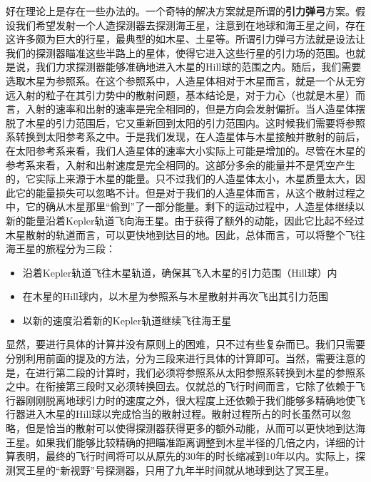 \documentclass[a4paper,openany]{book}
\begin{document}
好在理论上是存在一些办法的。一个奇特的解决方案就是所谓的\textbf{引力弹弓}方案。假设我们希望发射一个人造探测器去探测海王星，注意到在地球和海王星之间，存在这许多颇为巨大的行星，最典型的如木星、土星等。所谓引力弹弓方法就是设法让我们的探测器瞄准这些半路上的星体，使得它进入这些行星的引力场的范围。也就是说，我们力求探测器能够准确地进入木星的Hill球的范围之内。随后，我们需要选取木星为参照系。在这个参照系中，人造星体相对于木星而言，就是一个从无穷远入射的粒子在其引力势中的散射问题，基本结论是，对于力心（也就是木星）而言，入射的速率和出射的速率是完全相同的，但是方向会发射偏折。当人造星体摆脱了木星的引力范围后，它又重新回到太阳的引力范围内。这时候我们需要将参照系转换到太阳参考系之中。于是我们发现，在人造星体与木星接触并散射的前后，在太阳参考系来看，我们人造星体的速率大小实际上可能是增加的。尽管在木星的参考系来看，入射和出射速度是完全相同的。这部分多余的能量并不是凭空产生的，它实际上来源于木星的能量。只不过我们的人造星体太小，木星质量太大，因此它的能量损失可以忽略不计。但是对于我们的人造星体而言，从这个散射过程之中，它的确从木星那里“偷到”了一部分能量。剩下的运动过程中，人造星体继续以新的能量沿着Kepler轨道飞向海王星。由于获得了额外的动能，因此它比起不经过木星散射的轨道而言，可以更快地到达目的地。因此，总体而言，可以将整个飞往海王星的旅程分为三段：
\begin{itemize}
    \item[1.] 沿着Kepler轨道飞往木星轨道，确保其飞入木星的引力范围（Hill球）内
    \item[2.] 在木星的Hill球内，以木星为参照系与木星散射并再次飞出其引力范围
    \item[3.] 以新的速度沿着新的Kepler轨道继续飞往海王星
\end{itemize}
显然，要进行具体的计算并没有原则上的困难，只不过有些复杂而已。我们只需要分别利用前面的提及的方法，分为三段来进行具体的计算即可。当然，需要注意的是，在进行第二段的计算时，我们必须将参照系从太阳参照系转换到木星的参照系之中。在衔接第三段时又必须转换回去。仅就总的飞行时间而言，它除了依赖于飞行器刚刚脱离地球引力时的速度之外，很大程度上还依赖于我们能够多精确地使飞行器进入木星的Hill球以完成恰当的散射过程。散射过程所占的时长虽然可以忽略，但是恰当的散射可以使得探测器获得更多的额外动能，从而可以更快地到达海王星。如果我们能够比较精确的把瞄准距离调整到木星半径的几倍之内，详细的计算表明，最终的飞行时间将可以从原先的30年的时长缩减到10年以内。实际上，探测冥王星的“新视野”号探测器，只用了九年半时间就从地球到达了冥王星。
\end{document}
